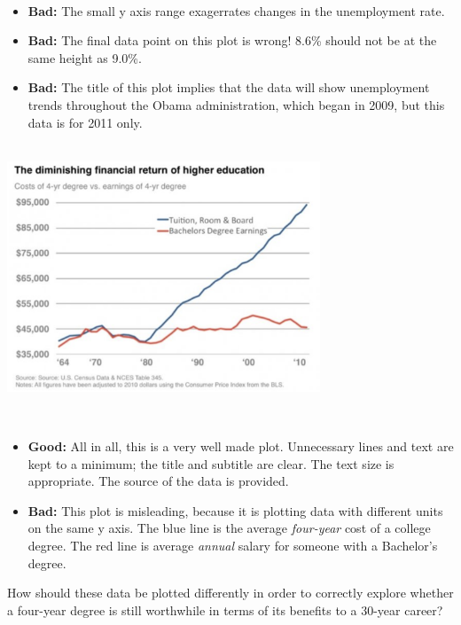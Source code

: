 \documentclass[
]{book}
\providecommand{\tightlist}{%
  \setlength{\itemsep}{0pt}\setlength{\parskip}{0pt}}
\begin{document}
~

\begin{itemize}
\tightlist
\item
  \textbf{Bad:} The small y axis range exagerrates changes in the unemployment rate.
\item
  \textbf{Bad:} The final data point on this plot is wrong! 8.6\% should not be at the same height as 9.0\%.
\item
  \textbf{Bad:} The title of this plot implies that the data will show unemployment trends throughout the Obama administration, which began in 2009, but this data is for 2011 only.
\end{itemize}

~\\

\includegraphics[width=0.7\textwidth,height=\textheight]{img/vis18.png}

~

\begin{itemize}
\item
  \textbf{Good:} All in all, this is a very well made plot. Unnecessary lines and text are kept to a minimum; the title and subtitle are clear. The text size is appropriate. The source of the data is provided.
\item
  \textbf{Bad:} This plot is misleading, because it is plotting data with different units on the same y axis. The blue line is the average \emph{four-year} cost of a college degree. The red line is average \emph{annual} salary for someone with a Bachelor's degree.
\end{itemize}

How should these data be plotted differently in order to correctly explore whether a four-year degree is still worthwhile in terms of its benefits to a 30-year career?

~\\
\end{document}
